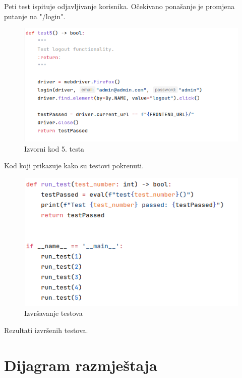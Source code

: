 			Peti test ispituje odjavljivanje korisnika. Očekivano ponašanje je promjena putanje na "/login".
			
			\begin{figure}[H]
				\includegraphics[width=\textwidth]{slike/selenium_test5.png}
				\centering
				\caption{Izvorni kod 5. testa}
				\label{fig:izvorni-kod-testa-5}
			\end{figure}
		
			Kod koji prikazuje kako su testovi pokrenuti.
			
			\begin{figure}[H]
				\includegraphics[width=\textwidth]{slike/selenium_running.png}
				\centering
				\caption{Izvršavanje testova}
				\label{fig:izvrsavanje-testova}
			\end{figure}
		
			Rezultati izvršenih testova.
				
			
			
			
			\eject 
		
		
		\section{Dijagram razmještaja}
			

